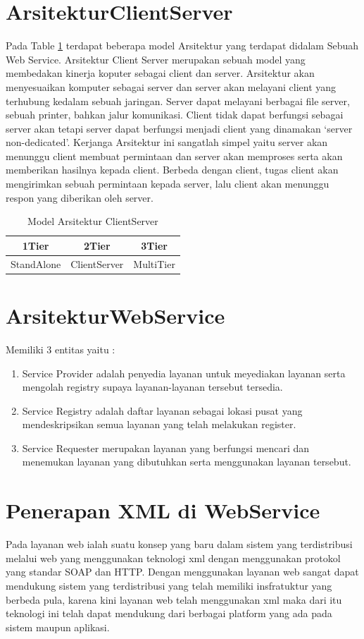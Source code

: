 
\section{ArsitekturClientServer}
    Pada Table \ref{1table} terdapat beberapa model Arsitektur yang terdapat didalam Sebuah Web Service. 
Arsitektur Client Server merupakan  sebuah model yang membedakan kinerja koputer sebagai client dan server. 
Arsitektur akan menyesuaikan komputer sebagai server dan server akan melayani client yang terhubung kedalam sebuah jaringan.
Server dapat melayani berbagai file server, sebuah printer, bahkan jalur komunikasi.
Client tidak dapat berfungsi sebagai server akan tetapi server dapat berfungsi menjadi client yang dinamakan `server non-dedicated'.
Kerjanga Arsitektur ini sangatlah simpel yaitu server akan menunggu client membuat permintaan dan server akan memproses serta
akan memberikan hasilnya kepada client. Berbeda dengan client, tugas client akan mengirimkan sebuah permintaan kepada server, lalu
client akan menunggu respon yang diberikan oleh server.

\begin{table}[ht]
\caption{Model Arsitektur Client\-Server}
\centering
\begin{tabular}{ccc}
\hline
1\-Tier&2\-Tier&3\-Tier\\
\hline
Stand\-Alone&Client\-Server&Multi\-Tier\\
\hline
\end{tabular}
\label{1table}
\end{table}

\section{ArsitekturWebService}
Memiliki 3 entitas yaitu :
\begin{enumerate}
\item Service Provider adalah penyedia layanan untuk meyediakan layanan serta mengolah registry supaya layanan-layanan tersebut tersedia.
\item Service Registry adalah daftar layanan sebagai lokasi pusat yang mendeskripsikan semua layanan yang telah melakukan register.
\item Service Requester merupakan layanan yang berfungsi mencari dan menemukan layanan yang dibutuhkan serta menggunakan layanan tersebut.
\end{enumerate}

\section{Penerapan XML di WebService}
Pada layanan web ialah suatu konsep yang baru dalam sistem yang terdistribusi melalui web yang menggunakan teknologi xml dengan 
menggunakan protokol yang standar SOAP dan HTTP. Dengan menggunakan layanan web sangat dapat mendukung sistem yang terdistribusi 
yang telah memiliki insfratuktur yang berbeda pula, karena kini layanan web telah menggunakan xml maka dari itu teknologi ini telah dapat 
mendukung dari berbagai platform yang ada pada sistem maupun aplikasi.


